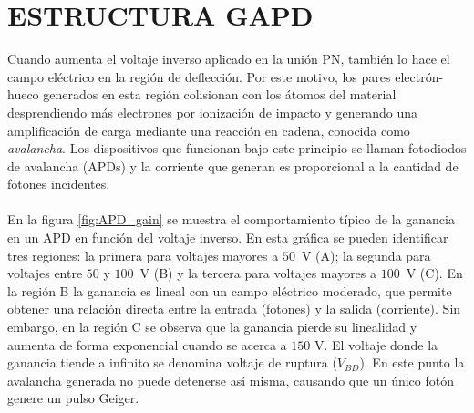 \section{ESTRUCTURA GAPD}
Cuando aumenta el voltaje inverso aplicado en la unión PN, también lo hace el campo eléctrico en la región de deflección. Por este motivo, los pares electrón-hueco generados en esta región colisionan con los átomos del material desprendiendo más electrones por ionización de impacto y generando una amplificación de carga mediante una reacción en cadena, conocida como \textit{avalancha}. Los dispositivos que funcionan bajo este principio se llaman fotodiodos de avalancha (APDs) y la corriente que generan es proporcional a la cantidad de fotones incidentes. \\ \\
En la figura \ref{fig:APD_gain} se muestra el comportamiento típico de la ganancia en un APD en función del voltaje inverso. En esta gráfica se pueden identificar tres regiones: la primera para voltajes mayores a $50$~V (A); la segunda para voltajes entre $50$ y $100$~V (B) y la tercera para voltajes mayores a $100$~V (C). En la región B la ganancia es lineal con un campo eléctrico moderado, que permite obtener una relación directa entre la entrada (fotones) y la salida (corriente). Sin embargo, en la región C se observa que la ganancia pierde su linealidad y aumenta de forma exponencial cuando se acerca a $150$ V. El voltaje  donde la ganancia tiende a infinito se denomina voltaje de ruptura ($V_{BD}$). En este punto la avalancha generada no puede detenerse así misma, causando que un único fotón genere un pulso Geiger.%
